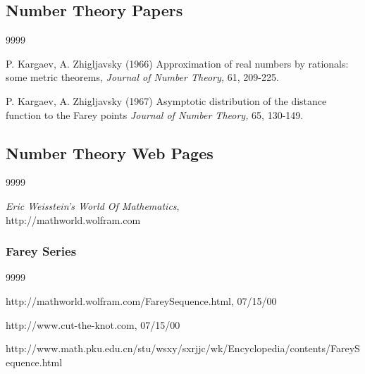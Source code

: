 
\subsection*{Number Theory Papers}

\begin{thecustombibliography}{9999}

 P.  Kargaev, A. Zhigljavsky (1966)
Approximation of real numbers by rationals: some metric theorems,
{\it Journal of Number Theory,} 61,  209-225.

 P.  Kargaev, A. Zhigljavsky (1967)
Asymptotic distribution of the distance function to the Farey points
{\it Journal of Number Theory,} 65,  130-149.

\end{thecustombibliography}


\subsection*{Number Theory Web Pages}

\begin{thecustombibliography}{9999}

{\it{Eric Weisstein's World Of Mathematics}},\\
http://mathworld.wolfram.com

\end{thecustombibliography}


\subsubsection{Farey Series}

\begin{thecustombibliography}{9999}


http://mathworld.wolfram.com/FareySequence.html, 07/15/00

http://www.cut-the-knot.com, 07/15/00

http://www.math.pku.edu.cn/stu/wsxy/sxrjjc/wk/Encyclopedia/contents/FareySequence.html

\end{thecustombibliography}


